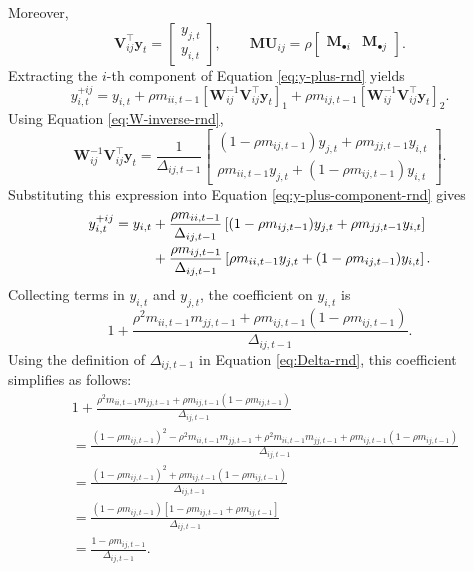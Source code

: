 Moreover,
\[
\mathbf{V}_{ij}^{\top}\mathbf{y}_t
=
\begin{bmatrix}
y_{j,t} \\
y_{i,t}
\end{bmatrix},
\qquad
\mathbf{M}\mathbf{U}_{ij}
=
\rho
\begin{bmatrix}
\mathbf{M}_{\bullet i} & \mathbf{M}_{\bullet j}
\end{bmatrix}.
\]
Extracting the $i$-th component of Equation \eqref{eq:y-plus-rnd} yields
\begin{equation}
y_{i,t}^{+ij}
=
y_{i,t}
+
\rho m_{ii,t-1}
\left[
\mathbf{W}_{ij}^{-1}
\mathbf{V}_{ij}^{\top}\mathbf{y}_t
\right]_1
+
\rho m_{ij,t-1}
\left[
\mathbf{W}_{ij}^{-1}
\mathbf{V}_{ij}^{\top}\mathbf{y}_t
\right]_2 .
\label{eq:y-plus-component-rnd}
\end{equation}
Using Equation \eqref{eq:W-inverse-rnd},
\[
\mathbf{W}_{ij}^{-1}
\mathbf{V}_{ij}^{\top}\mathbf{y}_t
=
\frac{1}{\Delta_{ij,t-1}}
\begin{bmatrix}
(1-\rho m_{ij,t-1})y_{j,t}
+
\rho m_{jj,t-1}y_{i,t}
\\
\rho m_{ii,t-1}y_{j,t}
+
(1-\rho m_{ij,t-1})y_{i,t}
\end{bmatrix}.
\]
Substituting this expression into Equation \eqref{eq:y-plus-component-rnd} gives
\begin{align}
y_{i,t}^{+ij}
=
y_{i,t}
&+
\frac{\rho m_{ii,t-1}}{\Delta_{ij,t-1}}
\left[
(1-\rho m_{ij,t-1})y_{j,t}
+
\rho m_{jj,t-1}y_{i,t}
\right]
\notag\\
&+
\frac{\rho m_{ij,t-1}}{\Delta_{ij,t-1}}
\left[
\rho m_{ii,t-1}y_{j,t}
+
(1-\rho m_{ij,t-1})y_{i,t}
\right].
\label{eq:y-plus-expanded-rnd}
\end{align}
Collecting terms in $y_{i,t}$ and $y_{j,t}$, the coefficient on $y_{i,t}$ is
\[
1
+
\frac{
\rho^2m_{ii,t-1}m_{jj,t-1}
+
\rho m_{ij,t-1}(1-\rho m_{ij,t-1})
}{
\Delta_{ij,t-1}
}.
\]
Using the definition of $\Delta_{ij,t-1}$ in Equation \eqref{eq:Delta-rnd}, this
coefficient simplifies as follows:
\begin{align*}
& 1
+
\frac{
\rho^2m_{ii,t-1}m_{jj,t-1}
+
\rho m_{ij,t-1}(1-\rho m_{ij,t-1})
}{
\Delta_{ij,t-1}
} \\
&=
\frac{
(1-\rho m_{ij,t-1})^2
-
\rho^2m_{ii,t-1}m_{jj,t-1}
+
\rho^2m_{ii,t-1}m_{jj,t-1}
+
\rho m_{ij,t-1}(1-\rho m_{ij,t-1})
}{
\Delta_{ij,t-1}
}
\\
&=
\frac{
(1-\rho m_{ij,t-1})^2
+
\rho m_{ij,t-1}(1-\rho m_{ij,t-1})
}{
\Delta_{ij,t-1}
}
\\
&=
\frac{
(1-\rho m_{ij,t-1})
\left[
1-\rho m_{ij,t-1}+\rho m_{ij,t-1}
\right]
}{
\Delta_{ij,t-1}
}
\\
&=
\frac{
1-\rho m_{ij,t-1}
}{
\Delta_{ij,t-1}
}.
\end{align*}
